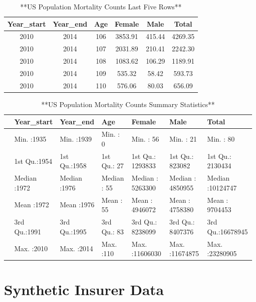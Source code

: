 \documentclass[
]{book}
\begin{document}
\begin{table}

\caption{\label{tab:unnamed-chunk-14}**US Population Mortality Counts Last Five Rows**}
\centering
\begin{tabular}[t]{c|c|c|c|c|c}
\hline
Year\_start & Year\_end & Age & Female & Male & Total\\
\hline
2010 & 2014 & 106 & 3853.91 & 415.44 & 4269.35\\
\hline
2010 & 2014 & 107 & 2031.89 & 210.41 & 2242.30\\
\hline
2010 & 2014 & 108 & 1083.62 & 106.29 & 1189.91\\
\hline
2010 & 2014 & 109 & 535.32 & 58.42 & 593.73\\
\hline
2010 & 2014 & 110 & 576.06 & 80.03 & 656.09\\
\hline
\end{tabular}
\end{table}

\begin{table}

\caption{\label{tab:unnamed-chunk-15}**US Population Mortality Counts Summary Statistics**}
\centering
\begin{tabular}[t]{l|l|l|l|l|l|l}
\hline
  &   Year\_start &    Year\_end &      Age &     Female &      Male &     Total\\
\hline
 & Min.   :1935 & Min.   :1939 & Min.   :  0 & Min.   :      56 & Min.   :      21 & Min.   :      80\\
\hline
 & 1st Qu.:1954 & 1st Qu.:1958 & 1st Qu.: 27 & 1st Qu.: 1293833 & 1st Qu.:  823082 & 1st Qu.: 2130434\\
\hline
 & Median :1972 & Median :1976 & Median : 55 & Median : 5263300 & Median : 4850955 & Median :10124747\\
\hline
 & Mean   :1972 & Mean   :1976 & Mean   : 55 & Mean   : 4946072 & Mean   : 4758380 & Mean   : 9704453\\
\hline
 & 3rd Qu.:1991 & 3rd Qu.:1995 & 3rd Qu.: 83 & 3rd Qu.: 8238099 & 3rd Qu.: 8407376 & 3rd Qu.:16678945\\
\hline
 & Max.   :2010 & Max.   :2014 & Max.   :110 & Max.   :11606030 & Max.   :11674875 & Max.   :23280905\\
\hline
\end{tabular}
\end{table}

\hypertarget{Sec:SyntheticInsData}{%
\section{Synthetic Insurer Data}\label{Sec:SyntheticInsData}}
\end{document}
